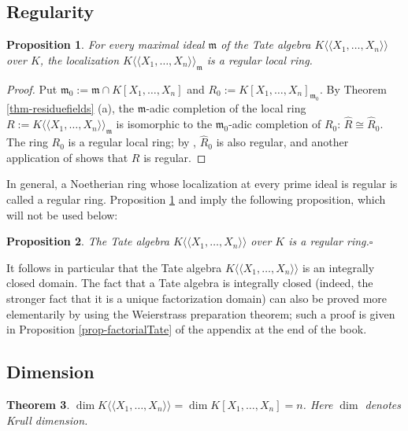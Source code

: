 \documentclass[a4paper,12pt, dvipdfmx]{jsbook}
\def\m{\mathfrak{m}}
\def\dl{\langle\!\langle}
\def\dr{\rangle\!\rangle}
\theoremstyle{plain}
\newtheorem{thm}{\bfseries Theorem}[section]
\newtheorem{prop}[thm]{\bfseries Proposition}
\theoremstyle{definition}
\begin{document}
\subsection{Regularity}\label{sub-localpropertiestatealgebras}
\begin{prop}\label{prop-regularlocalringstatealgebras}{\rm 
For every maximal ideal $\m$ of the Tate algebra $K\dl X_1,\ldots,X_n\dr$ over $K$, the localization $K\dl X_1,\ldots,X_n\dr_{\m}$ is a regular local ring.}
\end{prop}

\begin{proof}[Proof]
Put $\m_0:=\m\cap K[X_1,\ldots,X_n]$ and $R_0:=K[X_1,\ldots,X_n]_{\m_0}$.
By Theorem \ref{thm-residuefields} (a), the $\m$-adic completion of the local ring $R:=K\dl X_1,\ldots,X_n\dr_{\m}$ is isomorphic to the $\m_0$-adic completion of $R_0$: $\widehat{R}\cong\widehat{R}_0$.
The ring $R_0$ is a regular local ring; by \cite[Prop.\ 11.24]{AM}, $\widehat{R}_0$ is also regular, and another application of \cite[Prop.\ 11.24]{AM} shows that $R$ is regular.
\end{proof}

In general, a Noetherian ring whose localization at every prime ideal is regular is called a regular ring.
Proposition \ref{prop-regularlocalringstatealgebras} and \cite[Theorem 19.3]{Matsu} imply the following proposition, which will not be used below:
\begin{prop}\label{prop-regulartatealgebras}{\rm 
The Tate algebra $K\dl X_1,\ldots,X_n\dr$ over $K$ is a regular ring.}\hfill$\square$
\end{prop}

It follows in particular that the Tate algebra $K\dl X_1,\ldots,X_n\dr$ is an integrally closed domain.
The fact that a Tate algebra is integrally closed (indeed, the stronger fact that it is a unique factorization domain) can also be proved more elementarily by using the Weierstrass preparation theorem; such a proof is given in Proposition \ref{prop-factorialTate} of the appendix at the end of the book.

\subsection{Dimension}\label{sub-dimensionaffinoidalgebras}
\begin{thm}\label{thm-residuefields4}{\rm 
$\dim K\dl X_1,\ldots,X_n\dr=\dim K[X_1,\ldots,X_n]=n$. Here $\dim$ denotes Krull dimension.}
\end{thm}
\end{document}
